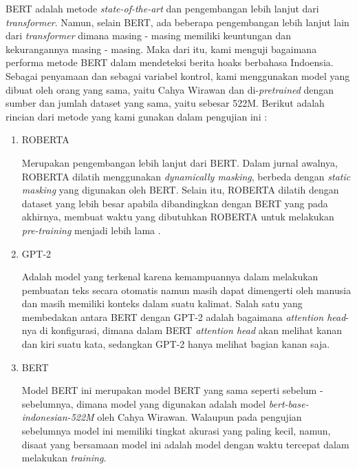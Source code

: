 BERT adalah metode \textit{state-of-the-art} dan pengembangan lebih lanjut dari \textit{transformer}. Namun, selain BERT, ada beberapa pengembangan lebih lanjut lain dari \textit{transformer} dimana masing - masing memiliki keuntungan dan kekurangannya masing - masing. Maka dari itu, kami menguji bagaimana performa metode BERT dalam mendeteksi berita hoaks berbahasa Indoensia. Sebagai penyamaan dan sebagai variabel kontrol, kami menggunakan model yang dibuat oleh orang yang sama, yaitu Cahya Wirawan dan di-\textit{pretrained} dengan sumber dan jumlah dataset yang sama, yaitu sebesar 522M. Berikut adalah rincian dari metode yang kami gunakan dalam pengujian ini :

\begin{enumerate}
    \item ROBERTA

          Merupakan pengembangan lebih lanjut dari BERT. Dalam jurnal awalnya, ROBERTA dilatih menggunakan \textit{dynamically masking}, berbeda dengan \textit{static masking} yang digunakan oleh BERT. Selain itu, ROBERTA dilatih dengan dataset yang lebih besar apabila dibandingkan dengan BERT yang pada akhirnya, membuat waktu yang dibutuhkan ROBERTA untuk melakukan \textit{pre-training} menjadi lebih lama \cite{roberta}.

    \item GPT-2

          Adalah model yang terkenal karena kemampuannya dalam melakukan pembuatan teks secara otomatis namun masih dapat dimengerti oleh manusia dan masih memiliki konteks dalam suatu kalimat. Salah satu yang membedakan antara BERT dengan GPT-2 adalah bagaimana \textit{attention head}-nya di konfigurasi, dimana dalam BERT \textit{attention head} akan melihat kanan dan kiri suatu kata, sedangkan GPT-2 hanya melihat bagian kanan saja.

    \item BERT

          Model BERT ini merupakan model BERT yang sama seperti sebelum - sebelumnya, dimana model yang digunakan adalah model \textit{bert-base-indonesian-522M} oleh Cahya Wirawan. Walaupun pada pengujian sebelumnya model ini memiliki tingkat akurasi yang paling kecil, namun, disaat yang bersamaan model ini adalah model dengan waktu tercepat dalam melakukan \textit{training}.
\end{enumerate}

